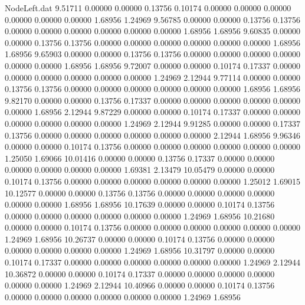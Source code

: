 \begin{filecontents}{NodeLeft.dat}
   9.51711    0.00000    0.00000     0.13756    0.10174    0.00000    0.00000    0.00000    0.00000    0.00000    0.00000    1.68956    1.24969
   9.56785    0.00000    0.00000     0.13756    0.13756    0.00000    0.00000    0.00000    0.00000    0.00000    0.00000    1.68956    1.68956
   9.60835    0.00000    0.00000     0.13756    0.13756    0.00000    0.00000    0.00000    0.00000    0.00000    0.00000    1.68956    1.68956
   9.65903    0.00000    0.00000     0.13756    0.13756    0.00000    0.00000    0.00000    0.00000    0.00000    0.00000    1.68956    1.68956
   9.72007    0.00000    0.00000     0.10174    0.17337    0.00000    0.00000    0.00000    0.00000    0.00000    0.00000    1.24969    2.12944
   9.77114    0.00000    0.00000     0.13756    0.13756    0.00000    0.00000    0.00000    0.00000    0.00000    0.00000    1.68956    1.68956
   9.82170    0.00000    0.00000     0.13756    0.17337    0.00000    0.00000    0.00000    0.00000    0.00000    0.00000    1.68956    2.12944
   9.87229    0.00000    0.00000     0.10174    0.17337    0.00000    0.00000    0.00000    0.00000    0.00000    0.00000    1.24969    2.12944
   9.91285    0.00000    0.00000     0.17337    0.13756    0.00000    0.00000    0.00000    0.00000    0.00000    0.00000    2.12944    1.68956
   9.96346    0.00000    0.00000     0.10174    0.13756    0.00000    0.00000    0.00000    0.00000    0.00000    0.00000    1.25050    1.69066
  10.01416    0.00000    0.00000     0.13756    0.17337    0.00000    0.00000    0.00000    0.00000    0.00000    0.00000    1.69381    2.13479
  10.05479    0.00000    0.00000     0.10174    0.13756    0.00000    0.00000    0.00000    0.00000    0.00000    0.00000    1.25012    1.69015
  10.12577    0.00000    0.00000     0.13756    0.13756    0.00000    0.00000    0.00000    0.00000    0.00000    0.00000    1.68956    1.68956
  10.17639    0.00000    0.00000     0.10174    0.13756    0.00000    0.00000    0.00000    0.00000    0.00000    0.00000    1.24969    1.68956
  10.21680    0.00000    0.00000     0.10174    0.13756    0.00000    0.00000    0.00000    0.00000    0.00000    0.00000    1.24969    1.68956
  10.26737    0.00000    0.00000     0.10174    0.13756    0.00000    0.00000    0.00000    0.00000    0.00000    0.00000    1.24969    1.68956
  10.31797    0.00000    0.00000     0.10174    0.17337    0.00000    0.00000    0.00000    0.00000    0.00000    0.00000    1.24969    2.12944
  10.36872    0.00000    0.00000     0.10174    0.17337    0.00000    0.00000    0.00000    0.00000    0.00000    0.00000    1.24969    2.12944
  10.40966    0.00000    0.00000     0.10174    0.13756    0.00000    0.00000    0.00000    0.00000    0.00000    0.00000    1.24969    1.68956

\end{filecontents}

